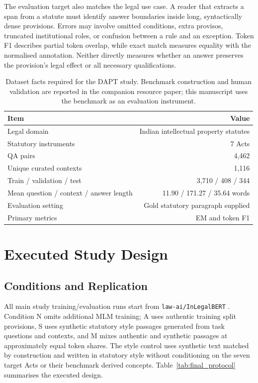 \documentclass[pdflatex,sn-basic]{sn-jnl}
\begin{document}
The evaluation target also matches the legal use case. A reader that extracts a
span from a statute must identify answer boundaries inside long, syntactically
dense provisions. Errors may involve omitted conditions, extra provisos,
truncated institutional roles, or confusion between a rule and an exception.
Token F1 describes partial token overlap, while exact match measures equality
with the normalised annotation. Neither directly measures whether an answer
preserves the provision's legal effect or all necessary qualifications.

\begin{table}[t]
\caption{Dataset facts required for the DAPT study. Benchmark construction and
human validation are reported in the companion resource paper; this manuscript
uses the benchmark as an evaluation instrument.}
\label{tab:data_summary}
\centering
\begin{tabular}{@{}lr@{}}
\toprule
Item & Value \\
\midrule
Legal domain & Indian intellectual property statutes \\
Statutory instruments & 7 Acts \\
QA pairs & 4,462 \\
Unique curated contexts & 1,116 \\
Train / validation / test & 3,710 / 408 / 344 \\
Mean question / context / answer length & 11.90 / 171.27 / 35.64 words \\
Evaluation setting & Gold statutory paragraph supplied \\
Primary metrics & EM and token F1 \\
\bottomrule
\end{tabular}
\end{table}


\FloatBarrier
\section{Executed Study Design}\label{sec:protocol}
\label{sec:method}

\subsection{Conditions and Replication}

All main study training/evaluation runs start from \texttt{law-ai/InLegalBERT}
\citep{paul2023pre}. Condition N omits additional MLM training; A uses authentic
training split provisions, S uses synthetic statutory style passages generated
from task questions and contexts, and M
mixes authentic and synthetic passages at approximately equal token shares.
The style control uses synthetic text matched by construction and written in statutory style
without conditioning on
the seven target Acts or their benchmark derived concepts.
Table~\ref{tab:final_protocol} summarises the executed design.
\end{document}
